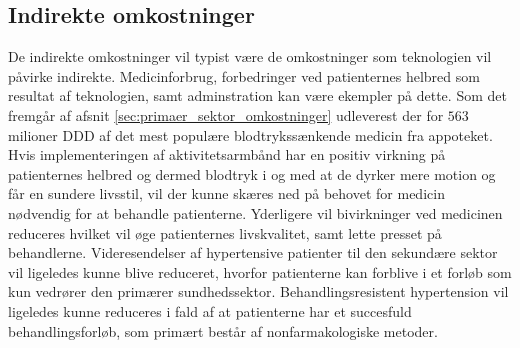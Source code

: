 \subsection{Indirekte omkostninger}
De indirekte omkostninger vil typist være de omkostninger som teknologien vil påvirke indirekte. Medicinforbrug, forbedringer ved patienternes helbred som resultat af teknologien, samt adminstration kan være ekempler på dette. 
Som det fremgår af afsnit \autoref{sec:primaer_sektor_omkostninger} udleverest der for $563$ milioner DDD af det mest populære blodtrykssænkende medicin fra appoteket. Hvis implementeringen af aktivitetsarmbånd har en positiv virkning på patienternes helbred og dermed blodtryk i og med at de dyrker mere motion og får en sundere livsstil, vil der kunne skæres ned på behovet for medicin nødvendig for at behandle patienterne. Yderligere vil bivirkninger ved medicinen reduceres hvilket vil øge patienternes livskvalitet, samt lette presset på behandlerne. 
Videresendelser af hypertensive patienter til den sekundære sektor vil ligeledes kunne blive reduceret, hvorfor patienterne kan forblive i et forløb som kun vedrører den primærer sundhedssektor. Behandlingsresistent hypertension vil ligeledes kunne reduceres i fald af at patienterne har et succesfuld behandlingsforløb, som primært består af nonfarmakologiske metoder.  













\begin{comment}
Hvad koster et Fitbit Flex? 
Hvilke besparelser tilbydes der så sundhedsektoren? 

Hvad koster det så at introducere patienterne til teknologien? 
	Hvad dækker den her introduktion minimum over, for at kunne anvende armbåndet? (Anvendelse af app og hvordan den skal oplades.)
	
Hvad koster det hvis de har spørgsmål vedr. teknologien? 


Langsigtet omkostninger - hvis behandlingen hjælper/ikke hjælper
- Besparelser vedr. medicinering 
- Besparelser vedr. ambulant forløb 
- Forebyggelse af behandlingsresistent hypertension = $$$$



EVT: Dags-takster i sekundær sektor (Ambulant).



En model i almen praktsis for implementeringen af aktivitetsarmbånd?

Honorartabel = \citep{honorartabel2016}
\end{comment}